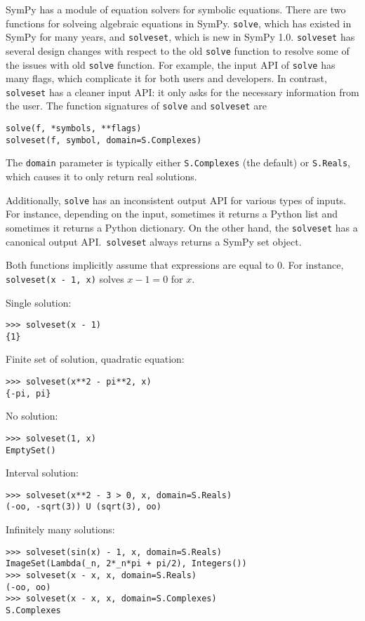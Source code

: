 SymPy has a module of equation solvers for symbolic equations. There are two
functions for solveing algebraic equations in SymPy. \texttt{solve}, which has
existed in SymPy for many years, and \texttt{solveset}, which is new in SymPy 1.0.
\texttt{solveset} has several design changes with respect to the old
\texttt{solve} function to resolve some of the issues with old \texttt{solve}
function. For example, the input API of \texttt{solve} has many flags, which
complicate it for both users and developers. In contrast, \texttt{solveset} has a
cleaner input API\@:  it only asks for the necessary information from the user.
The function signatures of \texttt{solve} and \texttt{solveset} are
\begin{verbatim}
solve(f, *symbols, **flags)
solveset(f, symbol, domain=S.Complexes)
\end{verbatim}
The \texttt{domain} parameter is typically either \texttt{S.Complexes} (the
default) or \texttt{S.Reals}, which causes it to only return real solutions.

Additionally, \texttt{solve} has an inconsistent output API for various types
of inputs. For instance, depending on the input, sometimes it returns a Python
list and sometimes it returns a Python dictionary. On the other hand, the
\texttt{solveset} has a canonical output API.\ \texttt{solveset} always returns
a SymPy set object.

Both functions implicitly assume that expressions are equal to 0. For
instance, \texttt{solveset(x - 1, x)} solves $x - 1 = 0$ for $x$.

\noindent Single solution:
\begin{verbatim}
>>> solveset(x - 1)
{1}
\end{verbatim}

\noindent Finite set of solution, quadratic equation:
\begin{verbatim}
>>> solveset(x**2 - pi**2, x)
{-pi, pi}
\end{verbatim}

\noindent No solution:
\begin{verbatim}
>>> solveset(1, x)
EmptySet()
\end{verbatim}

\noindent Interval solution:
\begin{verbatim}
>>> solveset(x**2 - 3 > 0, x, domain=S.Reals)
(-oo, -sqrt(3)) U (sqrt(3), oo)
\end{verbatim}

\noindent Infinitely many solutions:
\begin{verbatim}
>>> solveset(sin(x) - 1, x, domain=S.Reals)
ImageSet(Lambda(_n, 2*_n*pi + pi/2), Integers())
>>> solveset(x - x, x, domain=S.Reals)
(-oo, oo)
>>> solveset(x - x, x, domain=S.Complexes)
S.Complexes
\end{verbatim}

